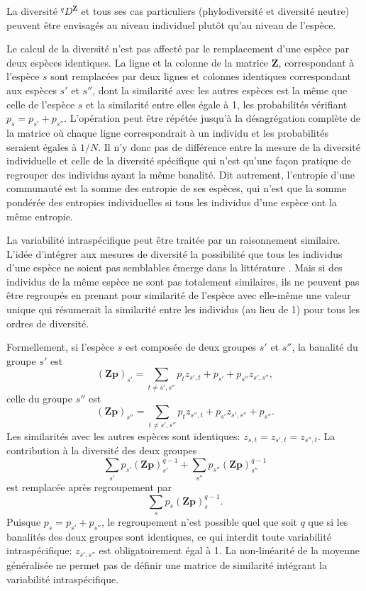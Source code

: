 \documentclass[
  11pt,
  french,
  a4paper,
  extrafontsizes,onecolumn,openright
  ]{memoir}
\begin{document}
La diversité \(^q\!D^{\mathbf{Z}}\) et tous ses cas particuliers (phylodiversité et diversité neutre) peuvent être envisagés au niveau individuel plutôt qu'au niveau de l'espèce.

Le calcul de la diversité n'est pas affecté par le remplacement d'une espèce par deux espèces identiques.
La ligne et la colonne de la matrice \(\mathbf{Z}\), correspondant à l'espèce \(s\) sont remplacées par deux lignes et colonnes identiques correspondant aux espèces \(s'\) et \(s''\), dont la similarité avec les autres espèces est la même que celle de l'espèce \(s\) et la similarité entre elles égale à 1, les probabilités vérifiant \(p_s=p_{s'}+p_{s''}\).
L'opération peut être répétée jusqu'à la désagrégation complète de la matrice où chaque ligne correspondrait à un individu et les probabilités seraient égales à \({1}/{N}\).
Il n'y donc pas de différence entre la mesure de la diversité individuelle et celle de la diversité spécifique qui n'est qu'une façon pratique de regrouper des individus ayant la même banalité.
Dit autrement, l'entropie d'une communauté est la somme des entropie de ses espèces, qui n'est que la somme pondérée des entropies individuelles si tous les individus d'une espèce ont la même entropie.

La variabilité intraspécifique peut être traitée par un raisonnement similaire.
L'idée d'intégrer aux mesures de diversité la possibilité que tous les individus d'une espèce ne soient pas semblables émerge dans la littérature \autocite{Pavoine2014b,Chiu2014b}.
Mais si des individus de la même espèce ne sont pas totalement similaires, ils ne peuvent pas être regroupés en prenant pour similarité de l'espèce avec elle-même une valeur unique qui résumerait la similarité entre les individus (au lieu de 1) pour tous les ordres de diversité.

Formellement, si l'espèce \(s\) est composée de deux groupes \(s'\) et \(s''\), la banalité du groupe \(s'\) est
\[{\left(\mathbf{Zp}\right)}_{s'}=\sum_{t \ne s', s''}{p_{t}z_{s',t}} + p_{s'} + p_{s''}z_{s',s''},\]
celle du groupe \(s''\) est
\[{\left(\mathbf{Zp}\right)}_{s''}=\sum_{t \ne s', s''}{p_{t}z_{s'',t}} + p_{s'}z_{s',s''} + p_{s''}.\]
Les similarités avec les autres espèces sont identiques: \(z_{s,t}=z_{s',t}=z_{s'',t}\).
La contribution à la diversité des deux groupes
\[\sum_{s'}{p_{s'}{\left(\mathbf{Zp}\right)}^{q-1}_{s'}}+\sum_{s''}{p_{s''}{\left(\mathbf{Zp}\right)}^{q-1}_{s''}}\]
est remplacée après regroupement par
\[\sum_{s}{p_{s}{\left(\mathbf{Zp}\right)}^{q-1}_{s}}.\]
Puisque \(p_s=p_{s'}+p_{s''}\), le regroupement n'est possible quel que soit \(q\) que si les banalités des deux groupes sont identiques, ce qui interdit toute variabilité intraspécifique: \(z_{s',s''}\) est obligatoirement égal à 1.
La non-linéarité de la moyenne généralisée ne permet pas de définir une matrice de similarité intégrant la variabilité intraspécifique.
\end{document}
